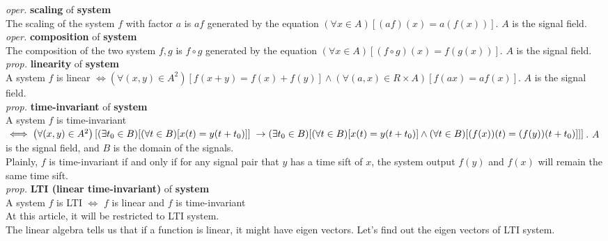 \documentclass{article}
\newcommand{\sd}[1]{{\left(#1\right)}}
\newcommand{\md}[1]{{\left[#1\right]}}
\newcommand{\oper}[2]{\emph{oper.} \textbf{#1} of \textbf{#2}}
\newcommand{\prop}[2]{\emph{prop.} \textbf{#1} of \textbf{#2}}
\begin{document}
\oper{scaling}{system}\\
The scaling of the system $f$ with factor $a$ is $af$ generated by the equation $\sd{\forall x \in A}\md{\sd{af}\sd{x} = a\sd{f\sd{x}}}$. $A$ is the signal field.\\
\oper{composition}{system}\\
The composition of the two system $f,g$ is $f\circ g$ generated by the equation $\sd{\forall x \in A}\md{\sd{f\circ g}\sd{x} = f\sd{g\sd{x}}}$. $A$ is the signal field.\\
\prop{linearity}{system}\\
A system $f$ is linear $\iff \sd{\forall \sd{x,y} \in A^2}\md{f\sd{x+y} = f\sd{x}+f\sd{y}}\land\sd{\forall \sd{a,x} \in R\times A}\md{f\sd{ax} = af\sd{x}}$. $A$ is the signal field.\\
\prop{time-invariant}{system}\\
A system $f$ is time-invariant \\
\begin{math}\iff \sd{\forall \sd{x,y} \in A^2}\left[\sd{\exists t_0 \in B}\md{\sd{\forall t \in B}\md{x\sd{t} = y\sd{t+t_0}}} \right.\\ \left. \to \sd{\exists t_0 \in B}\md{\sd{\forall t \in B}\md{x\sd{t} = y\sd{t+t_0}}\land\sd{\forall t \in B}\md{\sd{f\sd{x}}\sd{t} = \sd{f\sd{y}}\sd{t+t_0}}}\right]\end{math}.
$A$ is the signal field, and $B$ is the domain of the signals.\\
Plainly, $f$ is time-invariant if and only if for any signal pair that $y$ has a time sift of $x$, the system output $f\sd{y}$ and $f\sd{x}$ will remain the same time sift.\\
\prop{LTI (linear time-invariant)}{system}\\
A system $f$ is LTI $\iff$ $f$ is linear and $f$ is time-invariant\\
At this article, it will be restricted to LTI system.\\
The linear algebra tells us that if a function is linear, it might have eigen vectors. Let's find out the eigen vectors of LTI system.\\
\end{document}
